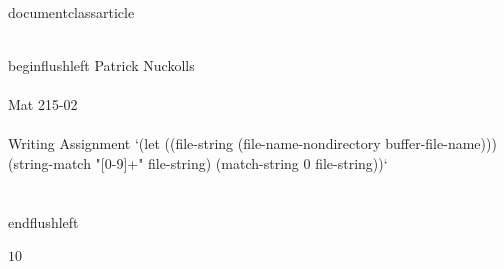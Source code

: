 \\documentclass{article}
\begin{document}
\\begin{flushleft}
	Patrick Nuckolls \\\\
	Mat 215-02 \\\\
	Writing Assignment `(let ((file-string (file-name-nondirectory buffer-file-name))) (string-match "[0-9]+" file-string) (match-string 0 file-string))` \\\\
\\end{flushleft}

$1$0

\
\end{document}
